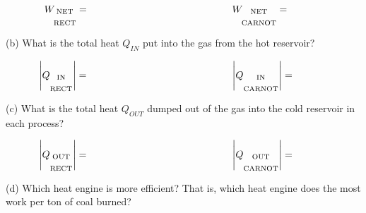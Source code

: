 \begin{displaymath}
\hspace{-0.5in} W_{\substack{\textrm{NET} \\ \\ \textrm{RECT}}} =
\hspace{2in} W_{\substack{\textrm{NET} \\ \\ \textrm{CARNOT}}} =
\end{displaymath}


(b)  What is the total heat $Q_{IN}$ put into the gas from the hot reservoir?

\begin{displaymath}
\hspace{-0.5in} \left| Q_{\substack{\textrm{IN} \\ \\ \textrm{RECT}}} \right| =
\hspace{2in} \left| Q_{\substack{\textrm{IN} \\ \\ \textrm{CARNOT}}} \right|=
\end{displaymath}


(c) What is the total heat $Q_{OUT}$ dumped out of the gas into the cold reservoir in each process?

\begin{displaymath}
\hspace{-0.5in} \left| Q_{\substack{\textrm{OUT} \\ \\ \textrm{RECT}}} \right| =
\hspace{2in} \left| Q_{\substack{\textrm{OUT} \\ \\ \textrm{CARNOT}}} \right|=
\end{displaymath}

(d)  Which heat engine is more efficient?  That is, which heat engine does the most work per ton of coal burned?





